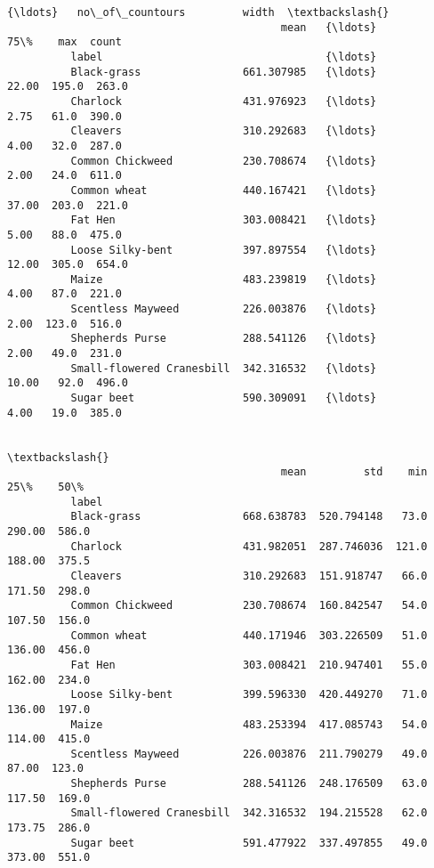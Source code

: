 \documentclass[11pt]{article}
\begin{document}
\begin{Verbatim}[commandchars=\\\{\}]
                                                  {\ldots}   no\_of\_countours         width  \textbackslash{}
                                           mean   {\ldots}               75\%    max  count   
          label                                   {\ldots}                                   
          Black-grass                661.307985   {\ldots}             22.00  195.0  263.0   
          Charlock                   431.976923   {\ldots}              2.75   61.0  390.0   
          Cleavers                   310.292683   {\ldots}              4.00   32.0  287.0   
          Common Chickweed           230.708674   {\ldots}              2.00   24.0  611.0   
          Common wheat               440.167421   {\ldots}             37.00  203.0  221.0   
          Fat Hen                    303.008421   {\ldots}              5.00   88.0  475.0   
          Loose Silky-bent           397.897554   {\ldots}             12.00  305.0  654.0   
          Maize                      483.239819   {\ldots}              4.00   87.0  221.0   
          Scentless Mayweed          226.003876   {\ldots}              2.00  123.0  516.0   
          Shepherds Purse            288.541126   {\ldots}              2.00   49.0  231.0   
          Small-flowered Cranesbill  342.316532   {\ldots}             10.00   92.0  496.0   
          Sugar beet                 590.309091   {\ldots}              4.00   19.0  385.0   
          
                                                                                   \textbackslash{}
                                           mean         std    min     25\%    50\%   
          label                                                                     
          Black-grass                668.638783  520.794148   73.0  290.00  586.0   
          Charlock                   431.982051  287.746036  121.0  188.00  375.5   
          Cleavers                   310.292683  151.918747   66.0  171.50  298.0   
          Common Chickweed           230.708674  160.842547   54.0  107.50  156.0   
          Common wheat               440.171946  303.226509   51.0  136.00  456.0   
          Fat Hen                    303.008421  210.947401   55.0  162.00  234.0   
          Loose Silky-bent           399.596330  420.449270   71.0  136.00  197.0   
          Maize                      483.253394  417.085743   54.0  114.00  415.0   
          Scentless Mayweed          226.003876  211.790279   49.0   87.00  123.0   
          Shepherds Purse            288.541126  248.176509   63.0  117.50  169.0   
          Small-flowered Cranesbill  342.316532  194.215528   62.0  173.75  286.0   
          Sugar beet                 591.477922  337.497855   49.0  373.00  551.0   
          

\end{Verbatim}
\end{document}
